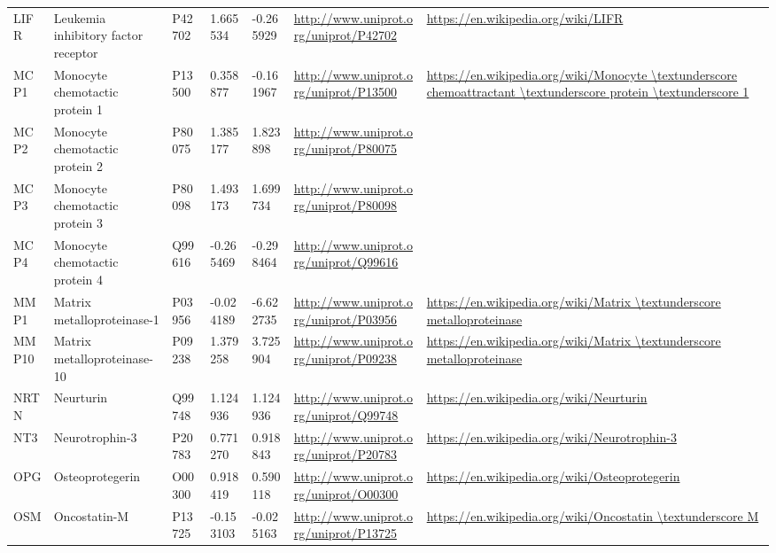 \begin{table}[H]
{\begin{tabular}{ lllllll }
        \multicolumn{1}{l|}{ LIFR } &  Leukemia inhibitory factor receptor   & P42702   & 1.665534   & -0.265929   & \url{http://www.uniprot.org/uniprot/P42702}   & \url{https://en.wikipedia.org/wiki/LIFR}          \\ 
        \multicolumn{1}{l|}{ MCP1 } &  Monocyte chemotactic protein 1   & P13500   & 0.358877   & -0.161967   & \url{http://www.uniprot.org/uniprot/P13500}   & \url{https://en.wikipedia.org/wiki/Monocyte \textunderscore chemoattractant \textunderscore protein \textunderscore 1}          \\ 
        \multicolumn{1}{l|}{ MCP2 } &  Monocyte chemotactic protein 2   & P80075   & 1.385177   & 1.823898   & \url{http://www.uniprot.org/uniprot/P80075}   &           \\ 
        \multicolumn{1}{l|}{ MCP3 } &  Monocyte chemotactic protein 3   & P80098   & 1.493173   & 1.699734   & \url{http://www.uniprot.org/uniprot/P80098}   &           \\ 
        \multicolumn{1}{l|}{ MCP4 } &  Monocyte chemotactic protein 4   & Q99616   & -0.265469   & -0.298464   & \url{http://www.uniprot.org/uniprot/Q99616}   &           \\ 
        \multicolumn{1}{l|}{ MMP1 } &  Matrix metalloproteinase-1   & P03956   & -0.024189   & -6.622735   & \url{http://www.uniprot.org/uniprot/P03956}   & \url{https://en.wikipedia.org/wiki/Matrix \textunderscore metalloproteinase}          \\ 
        \multicolumn{1}{l|}{ MMP10 } &  Matrix metalloproteinase-10   & P09238   & 1.379258   & 3.725904   & \url{http://www.uniprot.org/uniprot/P09238}   & \url{https://en.wikipedia.org/wiki/Matrix \textunderscore metalloproteinase}          \\ 
        \multicolumn{1}{l|}{ NRTN } &  Neurturin   & Q99748   & 1.124936   & 1.124936   & \url{http://www.uniprot.org/uniprot/Q99748}   & \url{https://en.wikipedia.org/wiki/Neurturin}          \\ 
        \multicolumn{1}{l|}{ NT3 } &  Neurotrophin-3   & P20783   & 0.771270   & 0.918843   & \url{http://www.uniprot.org/uniprot/P20783}   & \url{https://en.wikipedia.org/wiki/Neurotrophin-3}          \\ 
        \multicolumn{1}{l|}{ OPG } &  Osteoprotegerin   & O00300   & 0.918419   & 0.590118   & \url{http://www.uniprot.org/uniprot/O00300}   & \url{https://en.wikipedia.org/wiki/Osteoprotegerin}          \\ 
        \multicolumn{1}{l|}{ OSM } &  Oncostatin-M   & P13725   & -0.153103   & -0.025163   & \url{http://www.uniprot.org/uniprot/P13725}   & \url{https://en.wikipedia.org/wiki/Oncostatin \textunderscore M}          \\ 

\end{tabular}}
\end{table}
